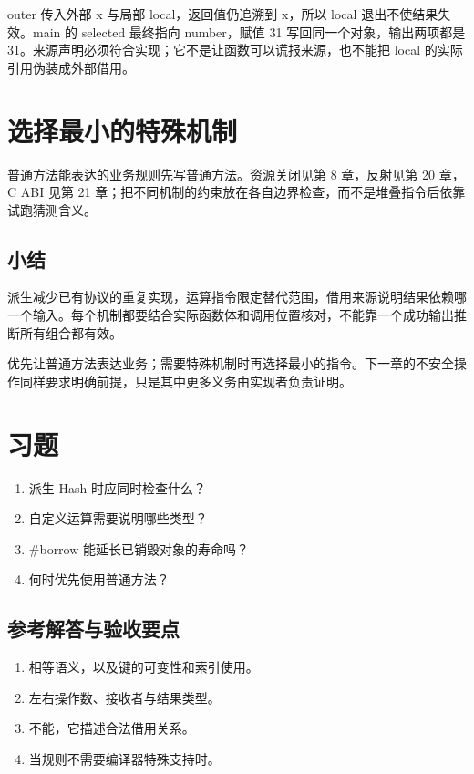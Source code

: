 outer 传入外部 x 与局部 local，返回值仍追溯到 x，所以 local 退出不使结果失效。main 的 selected 最终指向 number，赋值 31 写回同一个对象，输出两项都是 31。来源声明必须符合实现；它不是让函数可以谎报来源，也不能把 local 的实际引用伪装成外部借用。

\section{选择最小的特殊机制}

普通方法能表达的业务规则先写普通方法。资源关闭见第 8 章，反射见第 20 章，C ABI 见第 21 章；把不同机制的约束放在各自边界检查，而不是堆叠指令后依靠试跑猜测含义。

\subsection*{小结}

派生减少已有协议的重复实现，运算指令限定替代范围，借用来源说明结果依赖哪一个输入。每个机制都要结合实际函数体和调用位置核对，不能靠一个成功输出推断所有组合都有效。

优先让普通方法表达业务；需要特殊机制时再选择最小的指令。下一章的不安全操作同样要求明确前提，只是其中更多义务由实现者负责证明。

\section{习题}

\begin{enumerate}

\item 派生 Hash 时应同时检查什么？

\item 自定义运算需要说明哪些类型？

\item \#borrow 能延长已销毁对象的寿命吗？

\item 何时优先使用普通方法？

\end{enumerate}

\subsection*{参考解答与验收要点}

\begin{enumerate}

\item 相等语义，以及键的可变性和索引使用。

\item 左右操作数、接收者与结果类型。

\item 不能，它描述合法借用关系。

\item 当规则不需要编译器特殊支持时。

\end{enumerate}

